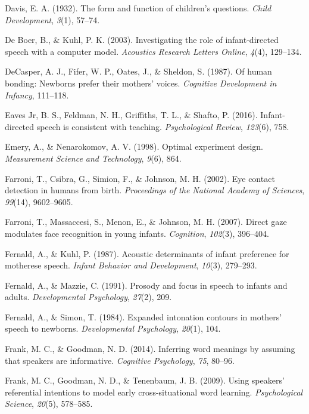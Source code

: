 \documentclass[a4paper,man,apacite,floatsintext]{apa6}
\begin{document}
\hypertarget{ref-davis1932form}{}
Davis, E. A. (1932). The form and function of children's questions.
\emph{Child Development}, \emph{3}(1), 57--74.

\hypertarget{ref-de2003investigating}{}
De Boer, B., \& Kuhl, P. K. (2003). Investigating the role of
infant-directed speech with a computer model. \emph{Acoustics Research
Letters Online}, \emph{4}(4), 129--134.

\hypertarget{ref-decasper1987human}{}
DeCasper, A. J., Fifer, W. P., Oates, J., \& Sheldon, S. (1987). Of
human bonding: Newborns prefer their mothers' voices. \emph{Cognitive
Development in Infancy}, 111--118.

\hypertarget{ref-eaves2016infant}{}
Eaves Jr, B. S., Feldman, N. H., Griffiths, T. L., \& Shafto, P. (2016).
Infant-directed speech is consistent with teaching. \emph{Psychological
Review}, \emph{123}(6), 758.

\hypertarget{ref-emery1998optimal}{}
Emery, A., \& Nenarokomov, A. V. (1998). Optimal experiment design.
\emph{Measurement Science and Technology}, \emph{9}(6), 864.

\hypertarget{ref-farroni2002eye}{}
Farroni, T., Csibra, G., Simion, F., \& Johnson, M. H. (2002). Eye
contact detection in humans from birth. \emph{Proceedings of the
National Academy of Sciences}, \emph{99}(14), 9602--9605.

\hypertarget{ref-farroni2007direct}{}
Farroni, T., Massaccesi, S., Menon, E., \& Johnson, M. H. (2007). Direct
gaze modulates face recognition in young infants. \emph{Cognition},
\emph{102}(3), 396--404.

\hypertarget{ref-fernald1987acoustic}{}
Fernald, A., \& Kuhl, P. (1987). Acoustic determinants of infant
preference for motherese speech. \emph{Infant Behavior and Development},
\emph{10}(3), 279--293.

\hypertarget{ref-fernald1991prosody}{}
Fernald, A., \& Mazzie, C. (1991). Prosody and focus in speech to
infants and adults. \emph{Developmental Psychology}, \emph{27}(2), 209.

\hypertarget{ref-fernald1984expanded}{}
Fernald, A., \& Simon, T. (1984). Expanded intonation contours in
mothers' speech to newborns. \emph{Developmental Psychology},
\emph{20}(1), 104.

\hypertarget{ref-frank2014inferring}{}
Frank, M. C., \& Goodman, N. D. (2014). Inferring word meanings by
assuming that speakers are informative. \emph{Cognitive Psychology},
\emph{75}, 80--96.

\hypertarget{ref-frank2009using}{}
Frank, M. C., Goodman, N. D., \& Tenenbaum, J. B. (2009). Using
speakers' referential intentions to model early cross-situational word
learning. \emph{Psychological Science}, \emph{20}(5), 578--585.
\end{document}
